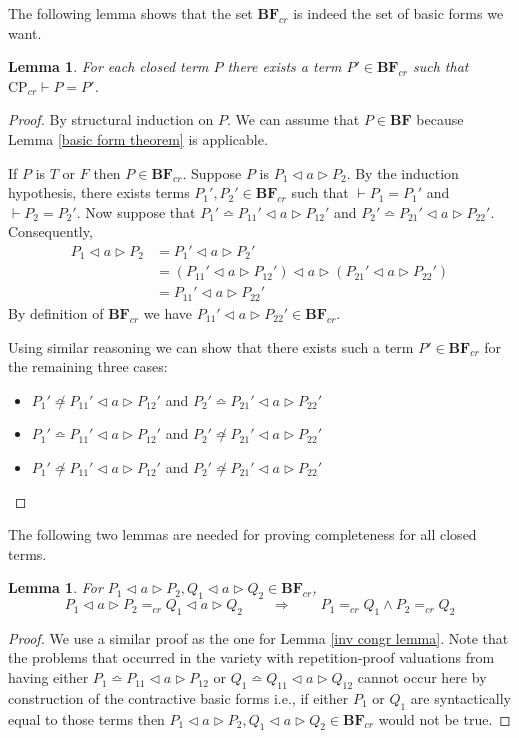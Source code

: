 \documentclass[a4paper,twoside,openright]{report}
\newcommand{\BF}{\ensuremath{\textbf{BF}}}
\newcommand{\syn}{\bumpeq}
\newcommand{\nsyn}{\not\bumpeq}
\newcommand{\lef}{\ensuremath{\triangleleft}}
\newcommand{\rig}{\ensuremath{\triangleright}}
\newtheorem{lem}[theorem]{Lemma}
\begin{document}
The following lemma shows that the set $\BF_{cr}$ is indeed the set of basic forms we want.
\begin{lem}
For each closed term $P$ there exists a term $P'\in\BF_{cr}$ such
that $\text{CP}_{cr}\vdash P=P'$.
\end{lem}
\begin{proof}
By structural induction on $P$. We can assume that $P\in\BF$ because Lemma \ref{basic form theorem} is applicable.

If $P$ is $T$ or $F$ then $P\in\BF_{cr}$. Suppose $P$ is $P_1\lef a\rig P_2$. By the induction hypothesis,
there exists terms $P_1',P_2'\in\BF_{cr}$ such that $\vdash P_1=P_1'$
and $\vdash P_2=P_2'$. Now suppose that $P_1'\syn P_{11}'\lef a\rig
P_{12}'$ and $P_2'\syn P_{21}'\lef a\rig P_{22}'$. Consequently,
\begin{align*}
P_1\lef a\rig P_2
&= P_1'\lef a\rig P_2'\\
&= (P_{11}'\lef a\rig P_{12}')\lef a\rig (P_{21}'\lef a\rig P_{22}')\\
&= P_{11}'\lef a\rig P_{22}'
\end{align*}
By definition of $\BF_{cr}$ we have $P_{11}'\lef a\rig
P_{22}'\in\BF_{cr}$.

Using similar reasoning we can show that there exists such a term
$P'\in\BF_{cr}$ for the remaining three cases:
\begin{itemize}
\item $P_1'\nsyn P_{11}'\lef a\rig P_{12}'$ and $P_2'\syn P_{21}'\lef a\rig P_{22}'$
\item $P_1'\syn P_{11}'\lef a\rig P_{12}'$ and $P_2'\nsyn P_{21}'\lef a\rig P_{22}'$
\item $P_1'\nsyn P_{11}'\lef a\rig P_{12}'$ and $P_2'\nsyn P_{21}'\lef a\rig P_{22}'$
\end{itemize}
\end{proof}
The following two lemmas are needed for proving completeness for all closed terms.
\begin{lem}
For $P_1\lef a\rig P_2,Q_1\lef a\rig Q_2\in\BF_{cr}$,
\[
P_1\lef a\rig P_2=_{cr}Q_1\lef a\rig Q_2\qquad\Longrightarrow\qquad P_1=_{cr}Q_1\wedge P_2=_{cr}Q_2
\]
\end{lem}
\begin{proof}
We use a similar proof as the one for Lemma \ref{inv congr lemma}. Note that the problems that occurred in the variety with repetition-proof valuations from having either $P_1\syn P_{11}\lef a\rig P_{12}$ or $Q_1\syn Q_{11}\lef a\rig Q_{12}$ cannot occur here by construction of the contractive basic forms i.e., if either $P_1$ or $Q_1$ are syntactically equal to those terms then $P_1\lef a\rig P_2,Q_1\lef a\rig Q_2\in\BF_{cr}$ would not be true.
\end{proof}
\end{document}
